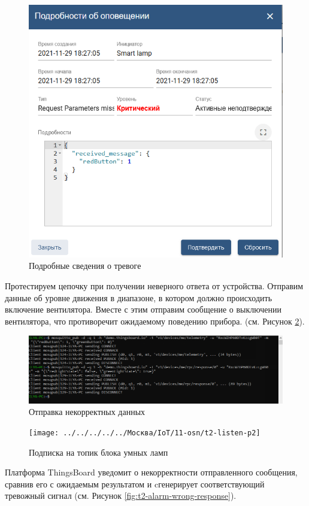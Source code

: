 \documentclass[a4paper,14pt]{extarticle}
\begin{document}
\begin{figure}[h!]
	\centering
	\includegraphics[width=0.7\linewidth]{images/t2-alarm-missing-params-detail}
	\caption{Подробные сведения о тревоге}
	\label{fig:t2-alarm-missing-params-detail}
\end{figure}

Протестируем цепочку при получении неверного ответа от устройства. Отправим данные об уровне движения в диапазоне, в котором должно происходить включение вентилятора. Вместе с этим отправим сообщение о выключении вентилятора, что противоречит ожидаемому поведению прибора. (см. Рисунок \ref{fig:t2-send-p2}).

\begin{figure}[h!]
	\centering
	\includegraphics[width=1\linewidth]{images/t2-send-p2}
	\caption{Отправка некорректных данных}
	\label{fig:t2-send-p2}
\end{figure}
\begin{figure}[h!]
	\centering
	\texttt{[image: ../../../../../Москва/IoT/11-osn/t2-listen-p2]}
	\caption{Подписка на топик блока умных ламп}
	\label{fig:t2-listen-p2w}
\end{figure}

Платформа ThingsBoard уведомит о некорректности отправленного сообщения, сравнив его с ожидаемым результатом и cгенерирует соответствующий тревожный сигнал (см. Рисунок \ref{fig:t2-alarm-wrong-response}).
\end{document}
